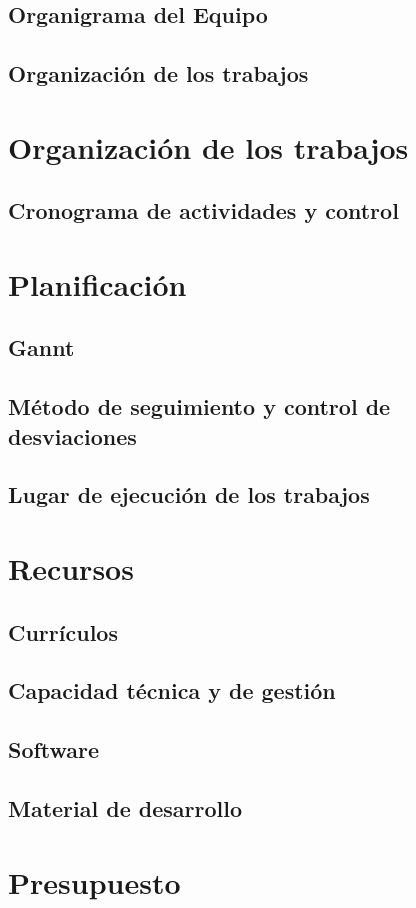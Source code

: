 \documentclass[10pt,a4paper,oldfontcommands]{dpds}
\begin{document}
\subsection{Organigrama del Equipo}
\subsection{Organización de los trabajos}



\section{Organización de los trabajos}
\subsection{Cronograma de actividades y control}



\section{Planificación}
\subsection{Gannt}
\subsection{Método de seguimiento y control de desviaciones}
\subsection{Lugar de ejecución de los trabajos}



\section{Recursos}
\subsection{Currículos}
\subsection{Capacidad técnica y de gestión}
\subsection{Software}
\subsection{Material de desarrollo}


\section{Presupuesto}
\end{document}
